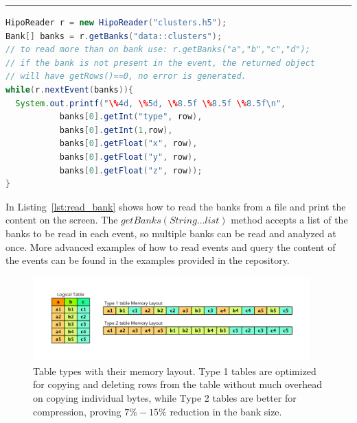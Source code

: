 \rule{15.5cm}{0.4pt}
\begin{lstlisting}[language=java, caption=Java example to read banks from the file, label=lst:read_bank]
HipoReader r = new HipoReader("clusters.h5");        
Bank[] banks = r.getBanks("data::clusters");
// to read more than on bank use: r.getBanks("a","b","c","d");
// if the bank is not present in the event, the returned object 
// will have getRows()==0, no error is generated.
while(r.nextEvent(banks)){
  System.out.printf("\%4d, \%5d, \%8.5f \%8.5f \%8.5f\n",
           banks[0].getInt("type", row),
           banks[0].getInt(1,row),
           banks[0].getFloat("x", row),
           banks[0].getFloat("y", row),
           banks[0].getFloat("z", row));
}
\end{lstlisting}

In Listing~\ref{lst:read_bank} shows how to read the banks from a file and print the content on the screen. The 
$getBanks(String... list)$ method accepts a list of the banks to be read in each event, so multiple banks can be
read and analyzed at once. More advanced examples of how to read events and query the content of the events 
can be found in the examples provided in the repository.

\begin{figure}[h!]
  \begin{center}
    \includegraphics[width=0.95\textwidth]{images/table_layouts.pdf}
 \end{center}
  \caption{Table types with their memory layout. Type 1 tables are optimized for copying and deleting rows from the table without much overhead on copying individual bytes, while Type 2 tables are better for compression, proving $7\%-15\%$ reduction in the bank size.}
 \label{fig:table_layouts}
\end{figure}

